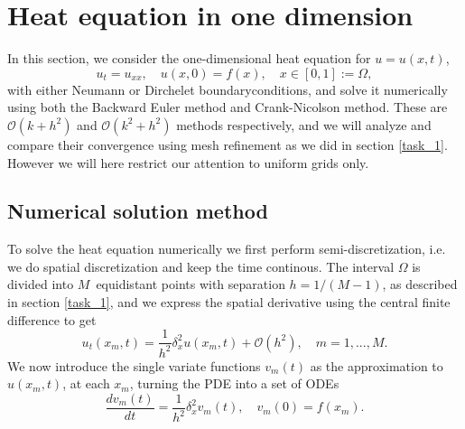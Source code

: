\section{Heat equation in one dimension}
In this section, we consider the one-dimensional heat equation for $u = u(x, t)$, 
\begin{equation*}
    u_t = u_{xx}, \quad u(x, 0) = f(x), \quad x \in [0,1] := \Omega, 
    \label{eq:heat-eq}
\end{equation*}
with either Neumann or Dirchelet boundaryconditions, 
and solve it numerically using both the Backward Euler method and Crank-Nicolson method. 
These are $\mathcal{O}(k+h^2)$ and $\mathcal{O}(k^2+h^2)$ methods respectively, 
and we will analyze and compare their convergence using mesh refinement as we did in section \ref{task_1}. However we will here restrict our attention to uniform grids only. 

\subsection{Numerical solution method}
To solve the heat equation numerically we first perform semi-discretization, 
i.e. we do spatial discretization and keep the time continous. 
The interval $\Omega$ is divided into $M$ equidistant points with separation $h=1/(M-1)$, 
as described in section \ref{task_1}, 
and we express the spatial derivative using the central finite difference to get %
\begin{equation*}
    u_t(x_m, t) = \frac{1}{h^2} \delta_x^2 u(x_m, t) + \mathcal{O}(h^2), 
    \quad m = 1,...,M.
\end{equation*}
We now introduce the single variate functions $v_m(t)$ as the approximation to $u(x_m, t)$, 
at each $x_m$, 
turning the PDE into a set of ODEs 
\begin{equation*}
    \frac{dv_m(t)}{dt} = \frac{1}{h^2} \delta_x^2 v_m(t), 
    \quad v_m(0) = f(x_m). 
\end{equation*}


